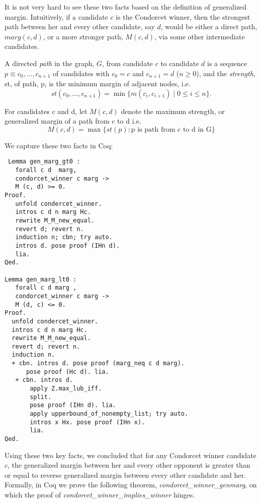  
 It is not very hard to see these two facts based on the definition of generalized margin. Intuitively, 
 if a candidate $c$ is the Condorcet winner, then the strongest path between her and every other 
 candidate, say $d$,  would be either a direct path, $marg (c, d)$, or a more stronger path, $M (c, d)$, 
 via some other intermediate candidates. 
  
 \begin{displayquote}
 A directed \emph{path} in the graph, $G$, from
candidate $c$ to candidate $d$ is a sequence $p \equiv c_0, \dots, c_{n+1}$
of candidates with $c_0 = c$ and $c_{n+1} = d$ ($n \geq 0$), and the
\emph{strength}, st, of path, p, is the minimum margin of adjacent
nodes, i.e.
\[ st(c_0, \dots, c_{n+1}) = \min \lbrace m (c_i, c_{i+1}) \mid 0
\leq i \leq n \rbrace. \]
\item For candidates c and d, let $M(c, d)$ denote the maximum strength, or generalized margin of a path
	from c to d i.e. 
	\[ M(c, d) = \max \lbrace st (p) : \text{p is path from c to d in G} \rbrace\]
  
   \end{displayquote}
   
 We capture these two facts in Coq:
 
 \begin{verbatim}
 Lemma gen_marg_gt0 :
   forall c d  marg, 
   condorcet_winner c marg -> 
   M (c, d) >= 0.
Proof. 
   unfold condercet_winner.
   intros c d n marg Hc.
   rewrite M_M_new_equal. 
   revert d; revert n.
   induction n; cbn; try auto.
   intros d. pose proof (IHn d).
   lia.
Qed.

Lemma gen_marg_lt0 :
   forall c d marg , 
   condorcet_winner c marg ->
   M (d, c) <= 0.
Proof.
  unfold condercet_winner.
  intros c d n marg Hc.
  rewrite M_M_new_equal.
  revert d; revert n.
  induction n.
  + cbn. intros d. pose proof (marg_neq c d marg).
      pose proof (Hc d). lia. 
   + cbn. intros d.
       apply Z.max_lub_iff. 
       split.
       pose proof (IHn d). lia.
       apply upperbound_of_nonempty_list; try auto.
       intros x Hx. pose proof (IHn x).
       lia.
Qed.
\end{verbatim}   
 
 Using these two key facts, we concluded that for any Condorcet winner candidate $c$, 
 the generalized margin between her and every other opponent is greater than or equal 
 to reverse generalized margin between every other candidate and her.  Formally, 
 in Coq we prove the following theorem, \textit{condorcet\_winner\_genmarg}, on which  the proof of 
 \textit{condorcet\_winner\_implies\_winner} hinges. 
 
